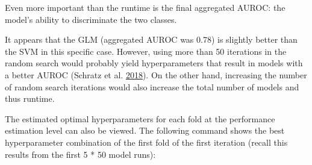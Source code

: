 \documentclass[]{krantz}
\newenvironment{Shaded}{\begin{snugshade}}{\end{snugshade}}
\newcommand{\CommentTok}[1]{\textcolor[rgb]{0.37,0.37,0.37}{\textit{#1}}}
\newcommand{\DecValTok}[1]{\textcolor[rgb]{0.06,0.06,0.06}{#1}}
\newcommand{\KeywordTok}[1]{\textcolor[rgb]{0.27,0.27,0.27}{\textbf{#1}}}
\newcommand{\NormalTok}[1]{#1}
\newcommand{\OperatorTok}[1]{\textcolor[rgb]{0.43,0.43,0.43}{\textbf{#1}}}
\newcommand{\StringTok}[1]{\textcolor[rgb]{0.5,0.5,0.5}{#1}}
\begin{document}
\begin{Shaded}
\end{Shaded}

Even more important than the runtime is the final aggregated AUROC: the model's ability to discriminate the two classes.

\begin{Shaded}
\end{Shaded}

It appears that the GLM (aggregated AUROC was 0.78) is slightly better than the SVM in this specific case.
However, using more than 50 iterations in the random search would probably yield hyperparameters that result in models with a better AUROC (Schratz et al. \protect\hyperlink{ref-schratz_performance_nodate}{2018}).
On the other hand, increasing the number of random search iterations would also increase the total number of models and thus runtime.

The estimated optimal hyperparameters for each fold at the performance estimation level can also be viewed.
The following command shows the best hyperparameter combination of the first fold of the first iteration (recall this results from the first 5 * 50 model runs):

\begin{Shaded}
\end{Shaded}
\end{document}
